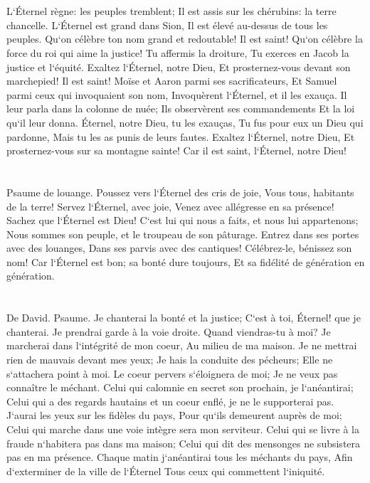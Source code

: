 \chapter{}

\verse L`Éternel règne: les peuples tremblent; Il est assis sur les chérubins: la terre chancelle. 
\verse L`Éternel est grand dans Sion, Il est élevé au-dessus de tous les peuples. 
\verse Qu`on célèbre ton nom grand et redoutable! Il est saint! 
\verse Qu`on célèbre la force du roi qui aime la justice! Tu affermis la droiture, Tu exerces en Jacob la justice et l`équité. 
\verse Exaltez l`Éternel, notre Dieu, Et prosternez-vous devant son marchepied! Il est saint! 
\verse Moïse et Aaron parmi ses sacrificateurs, Et Samuel parmi ceux qui invoquaient son nom, Invoquèrent l`Éternel, et il les exauça. 
\verse Il leur parla dans la colonne de nuée; Ils observèrent ses commandements Et la loi qu`il leur donna. 
\verse Éternel, notre Dieu, tu les exauças, Tu fus pour eux un Dieu qui pardonne, Mais tu les as punis de leurs fautes. 
\verse Exaltez l`Éternel, notre Dieu, Et prosternez-vous sur sa montagne sainte! Car il est saint, l`Éternel, notre Dieu! 

\chapter{}

\verse Psaume de louange. Poussez vers l`Éternel des cris de joie, Vous tous, habitants de la terre! 
\verse Servez l`Éternel, avec joie, Venez avec allégresse en sa présence! 
\verse Sachez que l`Éternel est Dieu! C`est lui qui nous a faits, et nous lui appartenons; Nous sommes son peuple, et le troupeau de son pâturage. 
\verse Entrez dans ses portes avec des louanges, Dans ses parvis avec des cantiques! Célébrez-le, bénissez son nom! 
\verse Car l`Éternel est bon; sa bonté dure toujours, Et sa fidélité de génération en génération. 

\chapter{}

\verse De David. Psaume. Je chanterai la bonté et la justice; C`est à toi, Éternel! que je chanterai. 
\verse Je prendrai garde à la voie droite. Quand viendras-tu à moi? Je marcherai dans l`intégrité de mon coeur, Au milieu de ma maison. 
\verse Je ne mettrai rien de mauvais devant mes yeux; Je hais la conduite des pécheurs; Elle ne s`attachera point à moi. 
\verse Le coeur pervers s`éloignera de moi; Je ne veux pas connaître le méchant. 
\verse Celui qui calomnie en secret son prochain, je l`anéantirai; Celui qui a des regards hautains et un coeur enflé, je ne le supporterai pas. 
\verse J`aurai les yeux sur les fidèles du pays, Pour qu`ils demeurent auprès de moi; Celui qui marche dans une voie intègre sera mon serviteur. 
\verse Celui qui se livre à la fraude n`habitera pas dans ma maison; Celui qui dit des mensonges ne subsistera pas en ma présence. 
\verse Chaque matin j`anéantirai tous les méchants du pays, Afin d`exterminer de la ville de l`Éternel Tous ceux qui commettent l`iniquité. 

